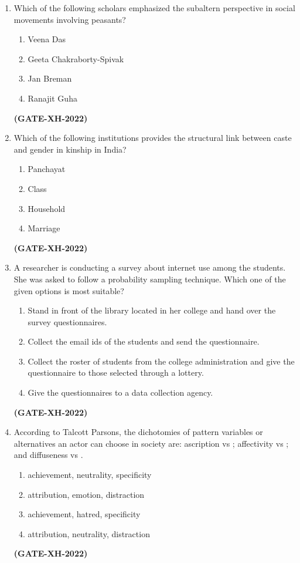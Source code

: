 \documentclass[journal]{IEEEtran}
\begin{document}
\begin{enumerate}
\item
Which of the following scholars emphasized the subaltern perspective in social movements involving peasants?
\begin{multicols}{2}
\begin{enumerate}
\item Veena Das
\item Geeta Chakraborty-Spivak
\item Jan Breman
\item Ranajit Guha
\end{enumerate}
\end{multicols}
\hfill\textbf{(GATE-XH-2022)}

\item
Which of the following institutions provides the structural link between caste and gender in kinship in India?

\begin{multicols}{4}
\begin{enumerate}
\item Panchayat
\item Class
\item Household
\item Marriage
\end{enumerate}
\end{multicols}
\hfill\textbf{(GATE-XH-2022)}

\item
A researcher is conducting a survey about internet use among the students. She was asked to follow a probability sampling technique. Which one of the given options is most suitable?
\begin{enumerate}
\item Stand in front of the library located in her college and hand over the survey questionnaires.
\item Collect the email ids of the students and send the questionnaire.
\item Collect the roster of students from the college administration and give the questionnaire to those selected through a lottery.
\item Give the questionnaires to a data collection agency.
\end{enumerate}
\hfill\textbf{(GATE-XH-2022)}

\item
According to Talcott Parsons, the dichotomies of pattern variables or alternatives an actor can choose in society are: ascription vs \underline{\hspace{1cm}}; affectivity vs \underline{\hspace{1cm}}; and diffuseness vs \underline{\hspace{1cm}}.
\begin{enumerate}
\item achievement, neutrality, specificity
\item attribution, emotion, distraction
\item achievement, hatred, specificity
\item attribution, neutrality, distraction
\end{enumerate}
\hfill\textbf{(GATE-XH-2022)}


\end{enumerate}
\end{document}
